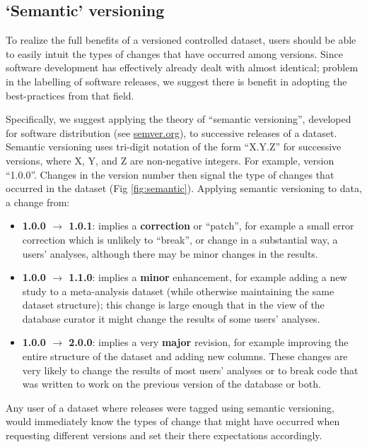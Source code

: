 \documentclass[a4paper,11pt]{article}
\begin{document}
\subsection{`Semantic' versioning}

To realize the full benefits of a versioned controlled dataset, users should be able to easily intuit the types of changes that have occurred among versions. Since software development has effectively already dealt with almost identical; problem in the labelling of software releases, we suggest there is benefit in adopting the best-practices from that field.

Specifically, we suggest applying the theory of ``semantic versioning'', developed for software distribution (see \href{http://semver.org/}{semver.org}), to successive releases of a dataset. Semantic versioning uses tri-digit notation of the form ``X.Y.Z'' for successive versions, where X, Y, and Z are non-negative integers. For example, version ``1.0.0''. Changes in the version number then signal the type of changes that occurred in the dataset (Fig \ref{fig:semantic}). Applying semantic versioning to data, a change from:
\begin{itemize}
  \item  {\bf 1.0.0 $\rightarrow$ 1.0.1}: implies a {\bf correction} or ``patch'', for example a small error correction which is unlikely to ``break'', or change in a substantial way, a users' analyses, although there may be minor changes in the results.
  \item {\bf 1.0.0 $\rightarrow$ 1.1.0}: implies a {\bf minor} enhancement, for example adding a new study to a meta-analysis dataset (while otherwise maintaining the same dataset structure); this change is large enough that in the view of the database curator it might change the results of some users' analyses.
  \item {\bf 1.0.0 $\rightarrow$ 2.0.0}: implies a very {\bf major} revision, for example improving the entire structure of the dataset and adding new columns. These changes are very likely to change the results of most users' analyses or to break code that was written to work on the previous version of the database or both.
\end{itemize}
Any user of a dataset where releases were tagged using semantic versioning, would immediately know the types of change that might have occurred when requesting different versions and set their there expectations accordingly.

\end{document}
